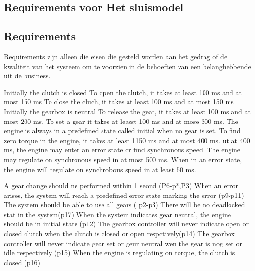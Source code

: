 \subsection{Requirements voor Het sluismodel}

 
\subsection{Requirements}
Requirements zijn alleen die eisen die gesteld worden aan het gedrag of de kwaliteit van het systeem om te voorzien in de behoeften van een belanghebbende uit de business.



Initially the clutch is closed
To open the clutch, it takes at least 100 ms and at most 150 ms
To close the cluch, it takes at least 100 ms and at most 150 ms
Initially the gearbox is neutral
To release the gear, it takes at least 100 ms and at most 200 ms.
To set a gear it takes at leasst 100 ms and at mose 300 ms.
The engine is always in a predefined state called initial when no gear is set.
To find zero torque in the engine, it takes at least 1150 ms and at most 400 ms. ut at 400 ms, the engine may enter an error state or find synchronous speed.
The  engine may regulate on synchronous speed in at most 500 ms.
When in an error state, the engine will regulate on synchrobous speed in at least 50 ms.


A gear change should ne performed within 1 seond (P6-p*,P3)
When an error arises, the system will reach a predefined error state marking the error (p9-p11)
The system should be able to use all gears ( p2-p3)
There will be no deadlocked stat in the system(p17)
When the system indicates gear neutral, the engine should  be in initial state (p12)
The gearbox controller will never indicate open or closed clutch when the clutch is closed or open respctively(p14)
The gearbox controller will never indicate gear set or geur neutral wen the gear is nog set or idle respectively (p15)
When the engine is regulating on torque, the clutch is closed (p16)








